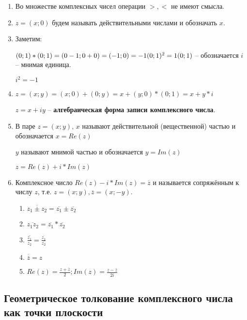 \documentclass{article}
\begin{document}
\begin{enumerate}
    \item Во множестве комплексных чисел операции $>, <$ не имеют смысла.
    \item $z = (x; 0)$ будем называть действительными числами и обозначать $x$.
    \item Заметим:

    $(0; 1) * (0; 1) = (0 - 1; 0 + 0) = (-1; 0) = -1 \\
    (0; 1)^2 = 1 \\ (0; 1)$ -- обозначается $i$ -- мнимая единица.

    $i^2 = -1$

    \item $z = (x; y) = (x; 0) + (0; y) = x + (y; 0) * (0; 1) = x + y * i$

    $z = x + iy$ -- \textbf{алгебраическая форма записи комплексного числа}.

    \item В паре $z = (x; y)$, $x$ называют действительной (вещественной)
    частью и обозначается $x = Re(z)$

    $y$ называют мнимой частью и обозначается $y = Im(z)$

    $z = Re(z) + i*Im(z)$

    \item Комплексное число $Re(z) - i*Im(z) = \overline{z}$ и называется
    сопряжённым к числу $z$, т.е. $z = (x;y), \overline{z} = (x; -y)$.
    \begin{enumerate}[label*=\arabic*.]
        \item $\overline{z_1 \pm z_2} = \overline{z_1} \pm \overline{z_2}$
        \item $\overline{z_1 z_2} = \overline{z_1} * \overline{z_2}$
        \item $\overline{\frac{z_1}{z_2}} = \frac{\overline{z_1}}{\overline{z_2}}$
        \item $\overline{\overline{z}} = z$
        \item $Re(z) = \frac{z + \overline{z}}{2}; Im(z) = \frac{z - \overline{z}}{2i}$
    \end{enumerate}
        
\end{enumerate}

\subsection{Геометрическое толкование комплексного числа как точки плоскости}
\end{document}
